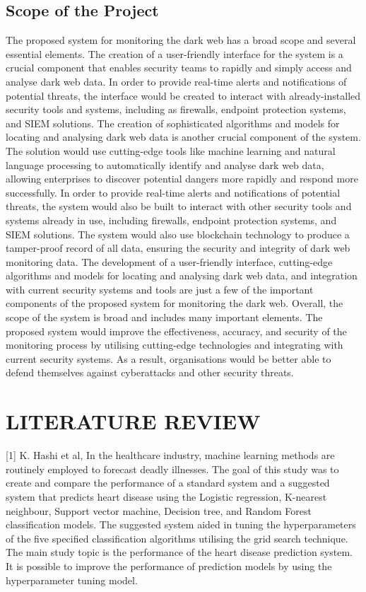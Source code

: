 \documentclass[10pt]{report}
\begin{document}
\section{Scope of the Project}
The proposed system for monitoring the dark web has a broad scope and several essential elements. The creation of a user-friendly interface for the system is a crucial component that enables security teams to rapidly and simply access and analyse dark web data. In order to provide real-time alerts and notifications of potential threats, the interface would be created to interact with already-installed security tools and systems, including as firewalls, endpoint protection systems, and SIEM solutions.
The creation of sophisticated algorithms and models for locating and analysing dark web data is another crucial component of the system. The solution would use cutting-edge tools like machine learning and natural language processing to automatically identify and analyse dark web data, allowing enterprises to discover potential dangers more rapidly and respond more successfully.
In order to provide real-time alerts and notifications of potential threats, the system would also be built to interact with other security tools and systems already in use, including firewalls, endpoint protection systems, and SIEM solutions. The system would also use blockchain technology to produce a tamper-proof record of all data, ensuring the security and integrity of dark web monitoring data.
The development of a user-friendly interface, cutting-edge algorithms and models for locating and analysing dark web data, and integration with current security systems and tools are just a few of the important components of the proposed system for monitoring the dark web. Overall, the scope of the system is broad and includes many important elements. The proposed system would improve the effectiveness, accuracy, and security of the monitoring process by utilising cutting-edge technologies and integrating with current security systems. As a result, organisations would be better able to defend themselves against cyberattacks and other security threats.

\chapter{LITERATURE REVIEW}
[1] K. Hashi et al, 
In the healthcare industry, machine learning methods are routinely employed to forecast deadly
illnesses. The goal of this study was to create and compare the performance of a standard system and a suggested system that predicts heart disease using the Logistic regression, K-nearest
neighbour, Support vector machine, Decision tree, and Random Forest classification models.
The suggested system aided in tuning the hyperparameters of the five specified classification
algorithms utilising the grid search technique. The main study topic is the performance of the
heart disease prediction system. It is possible to improve the performance of prediction models
by using the hyperparameter tuning model.
\end{document}
